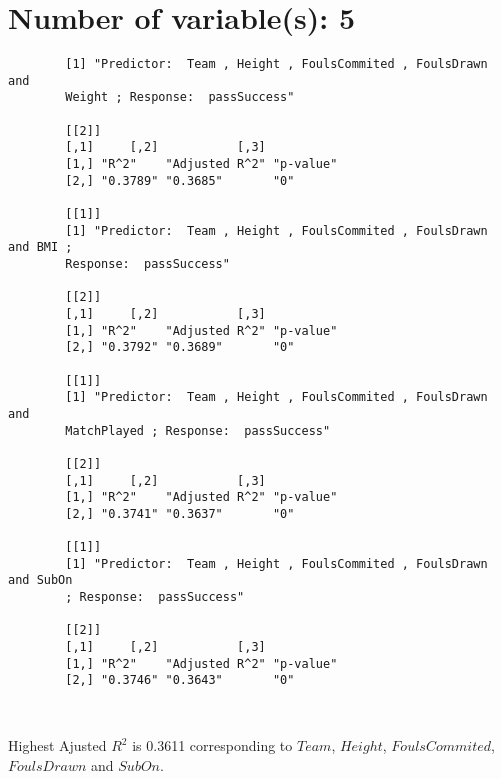 \documentclass[12pt]{article}
\begin{document}
	\section{Number of variable(s): 5}
	\begin{verbatim}
		[1] "Predictor:  Team , Height , FoulsCommited , FoulsDrawn and 
		Weight ; Response:  passSuccess"
		
		[[2]]
		[,1]     [,2]           [,3]     
		[1,] "R^2"    "Adjusted R^2" "p-value"
		[2,] "0.3789" "0.3685"       "0"      
		
		[[1]]
		[1] "Predictor:  Team , Height , FoulsCommited , FoulsDrawn and BMI ; 
		Response:  passSuccess"
		
		[[2]]
		[,1]     [,2]           [,3]     
		[1,] "R^2"    "Adjusted R^2" "p-value"
		[2,] "0.3792" "0.3689"       "0"      
		
		[[1]]
		[1] "Predictor:  Team , Height , FoulsCommited , FoulsDrawn and 
		MatchPlayed ; Response:  passSuccess"
		
		[[2]]
		[,1]     [,2]           [,3]     
		[1,] "R^2"    "Adjusted R^2" "p-value"
		[2,] "0.3741" "0.3637"       "0"      
		
		[[1]]
		[1] "Predictor:  Team , Height , FoulsCommited , FoulsDrawn and SubOn 
		; Response:  passSuccess"
		
		[[2]]
		[,1]     [,2]           [,3]     
		[1,] "R^2"    "Adjusted R^2" "p-value"
		[2,] "0.3746" "0.3643"       "0"      
		
		
	\end{verbatim}
	Highest Ajusted $ R^2 $ is 0.3611 corresponding to $ Team $, $ Height $, $ FoulsCommited $, $ FoulsDrawn $ and $ SubOn $.
	
\end{document}
